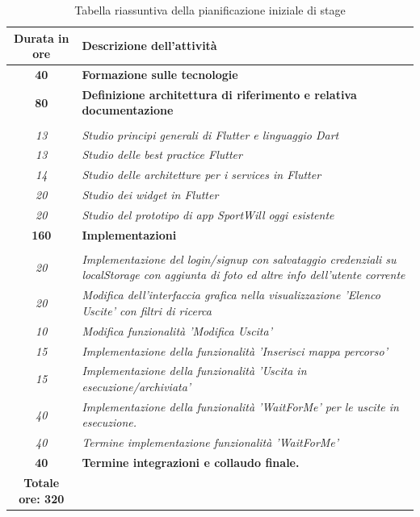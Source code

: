 \begin{center}
\begin{table}[h!]
	
	\label{tab:Tabella riassuntiva della pianificazione iniziale di stage}
	\begin{tabularx}{\textwidth}{|c|X|}
		
		\hline
		\textbf{Durata in ore} & \textbf{Descrizione dell'attività} \\\hline
		
		\textbf{40} & \textbf{Formazione sulle tecnologie} \\	 
		\hline
		
		\textbf{80} & \textbf{Definizione architettura di riferimento e relativa documentazione} \\  \hdashline
		\multirow{3}{0cm}\\ 
		\textit{13} & 
		\textit{Studio principi generali di Flutter e linguaggio Dart} \\
		\textit{13} & 
		\textit{Studio delle best practice Flutter} \\
		\textit{14} & 
		\textit{Studio delle architetture per i services in Flutter} \\
		\textit{20} & 
		\textit{Studio dei widget in Flutter} \\
		\textit{20} & 
		\textit{Studio del prototipo di app SportWill oggi esistente} \\
		\hline
		\textbf{160} & \textbf{Implementazioni} \\ \hdashline
		\multirow{3}{0cm}\\ 
		\textit{20} & 
		\textit{Implementazione del login/signup con salvataggio credenziali su localStorage con aggiunta di foto ed altre info dell’utente corrente} \\
		\textit{20} & 
		\textit{Modifica dell’interfaccia grafica nella visualizzazione ’Elenco Uscite’ con filtri di ricerca} \\
		\textit{10} & 
		\textit{Modifica funzionalità ’Modifica Uscita’} \\
		\textit{15} & 
		\textit{Implementazione della funzionalità ’Inserisci mappa percorso’} \\
		\textit{15} & 
		\textit{Implementazione della funzionalità ’Uscita in esecuzione/archiviata’} \\
		\textit{40} & 
		\textit{Implementazione della funzionalità ’WaitForMe’ per le uscite in esecuzione.} \\
		\textit{40} & 
		\textit{Termine implementazione funzionalità ’WaitForMe’} \\
		\hline
		
		\textbf{40} & \textbf{Termine integrazioni e collaudo finale.}  \\ 
		\hline
		
		\hline
		\textbf{Totale ore: 320} &  \\\hline	
	\end{tabularx}
	\vspace{0.3cm}
	\caption{Tabella riassuntiva della pianificazione iniziale di stage}
\end{table}
\end{center}
